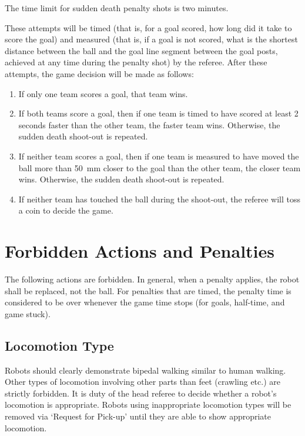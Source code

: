\documentclass[12pt]{article}
\begin{document}
The time limit for sudden death penalty shots is two minutes.

These attempts will be timed (that is, for a goal scored, how long did it take to score the goal) and measured (that is, if a goal is not scored, what is the shortest distance between the ball and the goal line segment between the goal posts, achieved at any time during the penalty shot) by the referee. After these attempts, the game decision will be made as follows:

\begin{enumerate}

\item If only one team scores a goal, that team wins.

\item If both teams score a goal, then if one team is timed to have scored at least 2 seconds faster than the other team, the faster team wins. Otherwise, the sudden death shoot-out is repeated.

\item If neither team scores a goal, then if one team is measured to have moved the ball more than 50~mm closer to the goal than the other team, the closer team wins. Otherwise, the sudden death shoot-out is repeated.

\item If neither team has touched the ball during the shoot-out, the referee will toss a coin to decide the game.

\end{enumerate}


\newpage


\section{Forbidden Actions and Penalties}
\label{sec:forbidden_act}

The following actions are forbidden. In general, when a penalty applies, the robot shall be replaced, not the ball. For penalties that are timed, the penalty time is considered to be over whenever the game time stops (for goals, half-time, and game stuck).

\subsection{Locomotion Type}
\label{sec:locomotion_type}

Robots should clearly demonstrate bipedal walking similar to human walking. Other types of locomotion involving other parts than feet (crawling etc.) are strictly forbidden. It is duty of the head referee to decide whether a robot's locomotion is appropriate. Robots using inappropriate locomotion types will be removed via `Request for Pick-up' until they are able to show appropriate locomotion.
\end{document}
